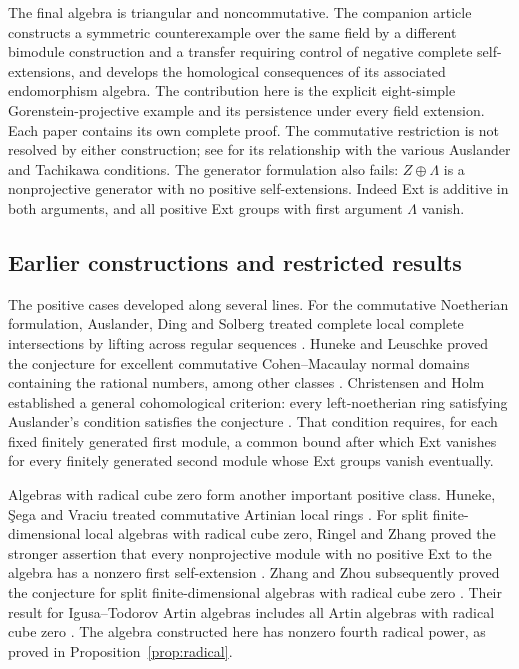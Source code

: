 The final algebra is triangular and noncommutative. The companion article
\cite[Theorem~1.1 and Corollary~1.2]{OpenAITachikawa2026} constructs a
symmetric counterexample over the
same field by a different bimodule construction and a transfer requiring
control of negative complete self-extensions, and develops the
homological consequences of its associated endomorphism algebra.
The contribution here is
the explicit eight-simple Gorenstein-projective example and its persistence
under every field extension. Each paper contains its own complete proof.
The commutative restriction is not resolved by either construction; see
\cite[Appendix A]{ChristensenHolm2010} for its relationship with the
various Auslander and Tachikawa conditions.
The generator formulation also fails: $Z\oplus\Lambda$ is a
nonprojective generator with no positive self-extensions. Indeed Ext is
additive in both arguments, and all positive Ext groups with first
argument $\Lambda$ vanish.

\subsection{Earlier constructions and restricted results}

The positive cases developed along several lines. For the commutative
Noetherian formulation, Auslander, Ding and Solberg treated complete
local complete intersections by lifting across
regular sequences \cite[Proposition~1.9]{AuslanderDingSolberg1993}.
Huneke and Leuschke proved the conjecture for excellent commutative
Cohen--Macaulay normal domains containing the rational numbers, among
other classes \cite[Theorem~0.1]{HunekeLeuschke2004}.
Christensen and Holm established a general cohomological criterion:
every left-noetherian ring satisfying Auslander's condition satisfies
the conjecture \cite[Theorem~A]{ChristensenHolm2010}. That condition
requires, for each fixed finitely generated first module, a common bound
after which Ext vanishes for every finitely generated second module whose Ext groups
vanish eventually.

Algebras with radical cube zero form another important positive class.
Huneke, \c{S}ega and Vraciu treated commutative Artinian local rings
\cite[Theorem~4.1(1)]{HunekeSegaVraciu2004}. For split finite-dimensional
local algebras with radical cube zero, Ringel and Zhang proved the
stronger assertion that every nonprojective module with no positive
Ext to the algebra has a nonzero first self-extension
\cite[Theorem~1.5]{RingelZhang2022}.
Zhang and Zhou subsequently proved the conjecture for split
finite-dimensional algebras with radical cube zero
\cite[Theorem~1.1]{ZhangZhou2026}. Their result for Igusa--Todorov
Artin algebras includes all Artin algebras with radical cube zero
\cite[Theorem~3.2 and Corollary~4.4]{ZhangZhouIgusaTodorov2026}.
The algebra constructed here has nonzero fourth radical power, as
proved in Proposition~\ref{prop:radical}.

